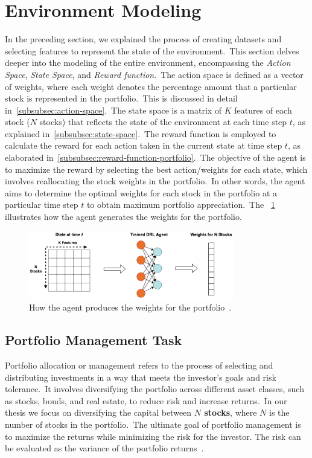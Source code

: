 \documentclass[../xlapes02]{subfiles}
\begin{document}
    \section{Environment Modeling}\label{sec:environment-modeling}
    In the preceding section, we explained the process of creating datasets and selecting features to represent the state of the environment.\ This section delves deeper into the modeling of the entire environment, encompassing the \emph{Action Space}, \emph{State Space}, and \emph{Reward function}.\ The action space is defined as a vector of weights, where each weight denotes the percentage amount that a particular stock is represented in the portfolio.\ This is discussed in detail in~\cref{subsubsec:action-space}.\ The state space is a matrix of $K$ features of each stock ($N$ stocks) that reflects the state of the environment at each time step $t$, as explained in~\cref{subsubsec:state-space}.\ The reward function is employed to calculate the reward for each action taken in the current state at time step $t$, as elaborated in~\cref{subsubsec:reward-function-portfolio}.\ The objective of the agent is to maximize the reward by selecting the best action/weights for each state, which involves reallocating the stock weights in the portfolio.\ In other words, the agent aims to determine the optimal weights for each stock in the portfolio at a particular time step $t$ to obtain maximum portfolio appreciation.\ The ~\cref{fig:state_agent_weights} illustrates how the agent generates the weights for the portfolio.

    \begin{figure}[ht!]
        \centering
        \includegraphics[width=0.8\textwidth]{./image/state_agent_weightss}
        \caption{How the agent produces the weights for the portfolio~\cite{finrl-portfolio-allocation-2020}.}
        \label{fig:state_agent_weights}
    \end{figure}

    \subsection{Portfolio Management Task}\label{subsec:portfolio-management-task}
    Portfolio allocation or management refers to the process of selecting and distributing investments in a way that meets the investor's goals and risk tolerance.\ It involves diversifying the portfolio across different asset classes, such as stocks, bonds, and real estate, to reduce risk and increase returns.\ In our thesis we focus on diversifying the capital between \textbf{$N$ stocks}, where $N$ is the number of stocks in the portfolio.\ The ultimate goal of portfolio management is to maximize the returns while minimizing the risk for the investor. The risk can be evaluated as the variance of the portfolio returns~\cite{finrl-portfolio-allocation-2020}.
\end{document}
